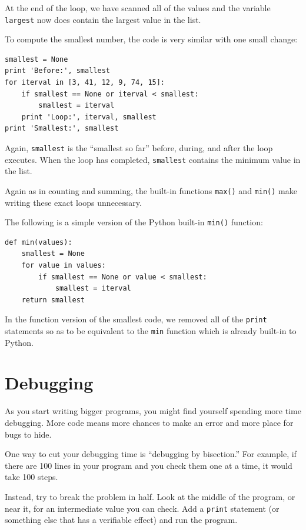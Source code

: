 \documentclass[10pt]{book}
\begin{document}
At the end of the loop, we have scanned all of the values and
the variable {\tt largest} now does contain the largest value
in the list.

To compute the smallest number, the code is very similar with one
small change:

\beforeverb
\begin{verbatim}
smallest = None
print 'Before:', smallest
for iterval in [3, 41, 12, 9, 74, 15]:
    if smallest == None or iterval < smallest:
        smallest = iterval
    print 'Loop:', iterval, smallest
print 'Smallest:', smallest
\end{verbatim}
\afterverb
%
Again, {\tt smallest} is the ``smallest so far'' before, during, and after the 
loop executes.  When the loop has completed, {\tt smallest} contains the
minimum value in the list.

Again as in counting and summing, the built-in functions 
{\tt max()} and {\tt min()} make writing these exact loops
unnecessary.

The following is a simple version of the Python built-in
{\tt min()} function:

\beforeverb
\begin{verbatim}
def min(values):
    smallest = None
    for value in values:
        if smallest == None or value < smallest:
            smallest = iterval
    return smallest
\end{verbatim}
\afterverb
%
In the function version of the smallest code, we removed all of the 
{\tt print} statements so as to be equivalent to the {\tt min} 
function which is already built-in to Python.

\section{Debugging}

As you start writing bigger programs, you might find yourself
spending more time debugging.  More code means more chances to
make an error and more place for bugs to hide.


One way to cut your debugging time is ``debugging by bisection.''
For example, if there are 100 lines in your program and you
check them one at a time, it would take 100 steps.

Instead, try to break the problem in half.  Look at the middle
of the program, or near it, for an intermediate value you
can check.  Add a {\tt print} statement (or something else
that has a verifiable effect) and run the program.
\end{document}
